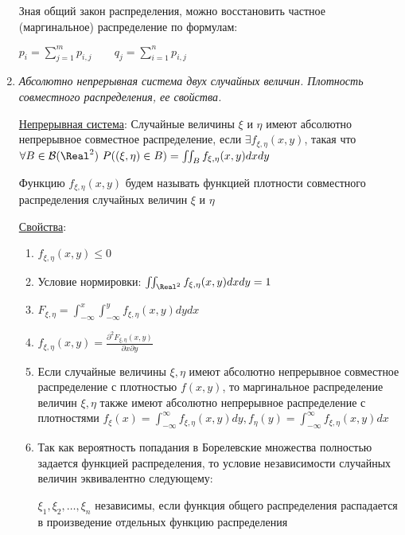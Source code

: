 \begin{enumerate}
    Зная общий закон распределения, можно восстановить частное (маргинальное) распределение по формулам: 

    $p_i = \sum_{j = 1}^m p_{i, j} \qquad q_j = \sum_{i = 1}^n p_{i, j}$

    \item \textit{Абсолютно непрерывная система двух случайных величин. Плотность совместного распределения, ее свойства.}
    
    \hyperlink{continuoussystemoftwovariables}{Непрерывная система}: Случайные величины $\xi$ и $\eta$ имеют абсолютно непрерывное совместное распределение, если
    $\exists f_{\xi, \eta}(x, y)$, такая что $\forall B \in \mathcal{B}(\Real^2) \ P((\xi, \eta) \in B) = \iint_B f_{\xi, \eta}(x, y) dxdy$

    Функцию $f_{\xi, \eta}(x, y)$ будем называть функцией плотности совместного распределения случайных величин $\xi$ и $\eta$

    \hyperlink{densityfunctionpropertiesincontinuoussystem}{Свойства}: 

    
    \begin{enumerate}
        \item $f_{\xi, \eta}(x, y) \leq 0$
        \item Условие нормировки: $\iint_{\Real^2} f_{\xi, \eta}(x, y) dxdy = 1$
        \item $F_{\xi, \eta} = \int_{-\infty}^x \int_{-\infty}^y f_{\xi, \eta}(x, y) dydx$

        \item $f_{\xi, \eta}(x, y) = \frac{\partial^2 F_{\xi, \eta}(x, y)}{\partial x \partial y}$
        
        \item Если случайные величины $\xi, \eta$ имеют абсолютно непрерывное совместное распределение с плотностью $f(x, y)$, 
        то маргинальное распределение величин $\xi, \eta$ также имеют абсолютно непрерывное распределение
        с плотностями $f_\xi(x) = \int_{-\infty}^\infty f_{\xi, \eta}(x, y) dy, f_\eta(y) = \int_{-\infty}^\infty f_{\xi, \eta}(x, y) dx$

        \item Так как вероятность попадания в Борелевские множества полностью задается функцией распределения, 
        то условие независимости случайных величин эквивалентно следующему:

        $\xi_1, \xi_2, \dots, \xi_n$ независимы, если функция общего распределения распадается в произведение 
        отдельных функцию распределения
    

\end{enumerate}
\end{enumerate}
